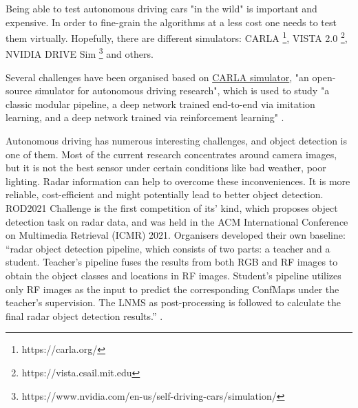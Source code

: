 \documentclass[twoside,11pt]{article}
\begin{document}
Being able to test autonomous driving cars "in the wild" is important and expensive. In order to fine-grain the algorithms at a less cost one needs to test them virtually. Hopefully, there are different simulators: CARLA \footnote{https://carla.org/}, VISTA 2.0 \footnote{https://vista.csail.mit.edu}, NVIDIA DRIVE Sim \footnote{https://www.nvidia.com/en-us/self-driving-cars/simulation/} and others.

Several challenges have been organised based on  \href{https://carla.org/}{CARLA simulator}, "an open-source simulator for autonomous driving research", which is used to study "a classic modular pipeline, a deep network trained end-to-end via
imitation learning, and a deep network trained via reinforcement learning" \citep{Dosovitskiy17}.

Autonomous driving has numerous interesting challenges, and object detection is one of them. Most of the current research concentrates around camera images, but it is not the best sensor under certain conditions like bad weather, poor lighting. Radar information can help to overcome these inconveniences. It is more reliable, cost-efficient and might potentially lead to better object detection. ROD2021 Challenge is the first competition of its' kind, which proposes object detection task on radar data, and was held in the ACM International Conference on Multimedia Retrieval (ICMR) 2021. Organisers developed their own baseline: “radar object detection pipeline, which consists of two parts: a teacher and a student. Teacher’s pipeline fuses the results from both RGB and RF images
to obtain the object classes and locations in RF images. Student’s pipeline
utilizes only RF images as the input to predict the corresponding ConfMaps
under the teacher’s supervision. The LNMS as post-processing is followed
to calculate the final radar object detection results.” \citep{9353210}.

\end{document}
